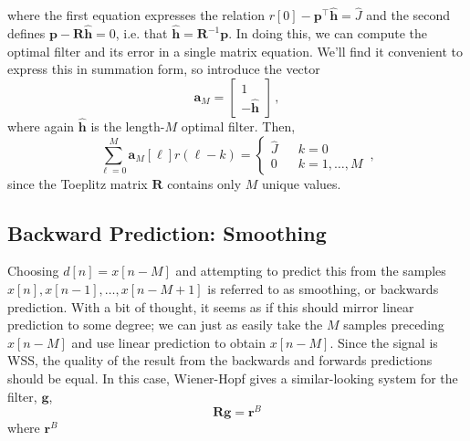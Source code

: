 %
where the first equation expresses the relation
$r[0] - \mathbf{p}^\top\hat{\mathbf{h}} = \hat{J}$ and the second
defines $\mathbf{p} - \mathbf{R}\hat{\mathbf{h}} = 0$, i.e. that
$\hat{\mathbf{h}} = \mathbf{R}^{-1}\mathbf{p}$. In doing this,
we can compute the optimal filter and its error in a single
matrix equation. We'll find it convenient to express this in
summation form, so introduce the vector
%
\begin{displaymath}
  \mathbf{a}_M = \left[\begin{array}{c}
      1 \\ -\hat{\mathbf{h}}
    \end{array}\right] \,,
\end{displaymath}
%
where again $\hat{\mathbf{h}}$ is the length-$M$ optimal filter. Then,
%
\begin{displaymath}
  \sum_{\ell=0}^M \mathbf{a}_M[\ell] r(\ell - k) = \left\{\begin{array}{ccl}
  \hat{J} & & k = 0\\ 0 & & k = 1, \hdots, M
  \end{array}\right. \,,
\end{displaymath}
%
since the Toeplitz matrix $\mathbf{R}$ contains only $M$ unique values.

\subsection{Backward Prediction: Smoothing}
%
Choosing $d[n] = x[n-M]$ and attempting to predict this from the
samples $x[n], x[n-1], \hdots, x[n-M+1]$ is referred to as smoothing,
or backwards prediction. With a bit of thought, it seems as if this
should mirror linear prediction to some degree; we can just as easily
take the $M$ samples preceding $x[n-M]$ and use linear prediction to
obtain $x[n-M]$. Since the signal is WSS, the quality of the result
from the backwards and forwards predictions should be equal. In this
case, Wiener-Hopf gives a similar-looking system for the filter,
$\mathbf{g}$,
%
\begin{displaymath}
  \mathbf{Rg} = \mathbf{r}^B
\end{displaymath}
%
where $\mathbf{r}^B$


